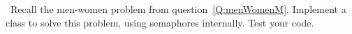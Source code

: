 \begin{question}
\Programming\ 
Recall the men-women problem from question~\ref{Q:menWomenM}.  
Implement a class to solve this problem, using semaphores internally.
Test your code.
\end{question}


